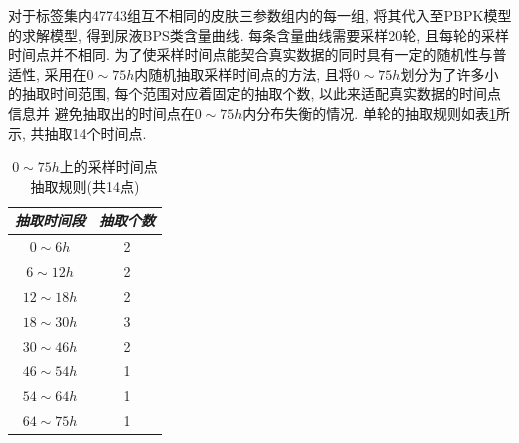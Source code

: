 \documentclass[a4paper,punct=banjiao,twoside]{ctexrep}
\theoremstyle{plain}
\theoremstyle{definition}
\theoremstyle{remark}
\begin{document}
对于标签集内47743组互不相同的皮肤三参数组内的每一组, 将其代入至PBPK模型的求解模型, 得到尿液BPS类含量曲线. 每条含量曲线需要采样20轮, 且每轮的采样时间点并不相同.
为了使采样时间点能契合真实数据的同时具有一定的随机性与普适性, 采用在$0\sim 75h$内随机抽取采样时间点的方法, 且将$0\sim 75h$划分为了许多小的抽取时间范围, 每个范围对应着固定的抽取个数, 以此来适配真实数据的时间点信息并
避免抽取出的时间点在$0\sim 75h$内分布失衡的情况. 单轮的抽取规则如表\ref{tab5}所示, 共抽取14个时间点.

\begin{table}[htbp]
  \centering
  \begin{tabular}[t]{c*{1}{c}}
    \hline
    \textit{抽取时间段} & \textit{抽取个数}\\
    \hline
    $0\sim 6h$&  2 \\ 
    $6\sim 12h$&  2 \\ 
    $12\sim 18h$&  2 \\ 
    $18\sim 30h$&  3 \\ 
    $30\sim 46h$&  2 \\ 
    $46\sim 54h$&  1 \\ 
    $54\sim 64h$&  1 \\ 
    $64\sim 75h$&  1 \\ 
    \hline
  \end{tabular}
  \caption{\label{tab5}$0\sim75h$上的采样时间点抽取规则(共14点)} 
\end{table}  
\end{document}
